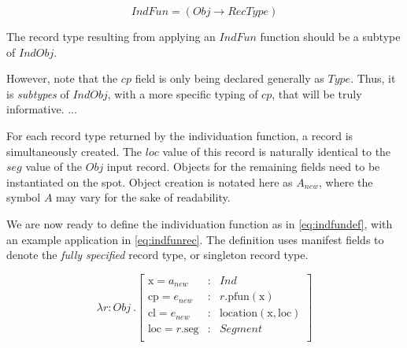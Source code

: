 \begin{equation}\label{eq:indfun}
IndFun = ( Obj \rightarrow RecType )
\end{equation}

The record type resulting from applying an $IndFun$ function should be a subtype of $IndObj$.

However, note that the $cp$ field is only being declared generally as $Type$.
Thus, it is \textit{subtypes} of $IndObj$, with a more specific typing of $cp$, that will be truly informative.
...

For each record type returned by the individuation function, a record is simultaneously created.
The $loc$ value of this record is naturally identical to the $seg$ value of the $Obj$ input record.
Objects for the remaining fields need to be instantiated on the spot.
Object creation is notated here as $A_{new}$, where the symbol $A$ may vary for the sake of readability.

We are now ready to define the individuation function as in \autoref{eq:indfundef}, with an example application in \autoref{eq:indfunrec}.
The definition uses manifest fields to denote the \textit{fully specified} record type, or singleton record type.

\begin{equation}\label{eq:indfundef}
\lambda r : Obj\ . \left[\begin{array}{lcl}
    \text{x} = a_{new} &:& Ind \\
    \text{cp} = e_{new} &:& r.\text{pfun}(\text{x}) \\
    \text{cl} = e_{new} &:& \text{location}(\text{x}, \text{loc}) \\
    \text{loc} = r.\text{seg} &:& Segment\\
\end{array}\right]
\end{equation}

